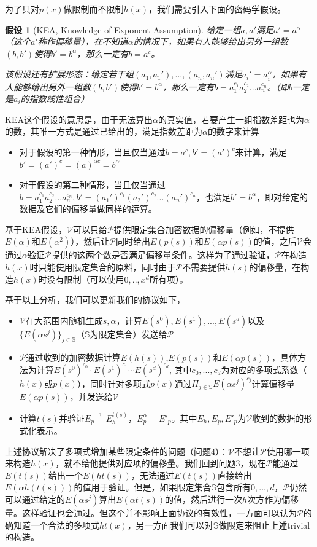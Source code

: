 \documentclass[12pt]{article}
\newcommand{\pp}{$\mathcal{P}$}
\newcommand{\vv}{$\mathcal{V}$}
\newtheorem{assumption}{假设}
\begin{document}
为了只对$p(x)$做限制而不限制$h(x)$，我们需要引入下面的密码学假设。
\begin{assumption}[KEA, Knowledge-of-Exponent Assumption]
	给定一组$a,a'$满足$a'= a^\alpha$（这个$a'$称作偏移量），在不知道$\alpha$的情况下，如果有人能够给出另外一组数$(b,b')$使得$b'= b^\alpha$，那么一定有$b=a^c$。

	该假设还有扩展形态：给定若干组$(a_1,a_1'),...,(a_n,a_n')$满足$a_i'=a_i^\alpha$，如果有人能够给出另外一组数$(b,b')$使得$b'= b^\alpha$，那么一定有$b=a_1^{c_1}a_2^{c_2}...a_n^{c_n}$。（即$b$一定是$a_i$的指数线性组合）
\end{assumption}
KEA这个假设的意思是，由于无法算出$\alpha$的真实值，若要产生一组指数差距也为$\alpha$的数，其唯一方式是通过已给出的，满足指数差距为$\alpha$的数字来计算
\begin{itemize}
	\item 对于假设的第一种情形，当且仅当通过$b=a^c,b'=(a')^c$来计算，满足$b'= (a')^c=(a)^{\alpha c} = b^\alpha$
	\item 对于假设的第二种情形，当且仅当通过$b=a_1^{c_1}a_2^{c_2}...a_n^{c_n},b'=(a_1')^{c_1}(a_2')^{c_2}...(a_n')^{c_n}$，也满足$b'=b^\alpha$，即对给定的数据及它们的偏移量做同样的运算。
\end{itemize}
基于KEA假设，\vv 可以只给\pp 提供限定集合加密数据的偏移量（例如，不提供$E(\alpha)$和$E(\alpha ^2)$），然后让\pp 同时给出$E(p(s))$和$E(\alpha p(s))$的值，之后\vv 会通过$\alpha$验证\pp 提供的这两个数是否满足偏移量条件。这样为了通过验证，\pp 在构造$h(x)$时只能使用限定集合的原料，同时由于\pp 不需要提供$h(s)$的偏移量，在构造$h(x)$时没有限制（可以使用$0,..,x^d$所有项）。

基于以上分析，我们可以更新我们的协议如下，
\begin{itemize}
	\item \vv 在大范围内随机生成$s,\alpha$，计算$E(s^0),E(s^1),...,E(s^d)$以及$\{E(\alpha s^j)\}_{j\in \mathbb{S}}$（$\mathbb{S}$为限定集合）发送给\pp
	\item \pp 通过收到的加密数据计算$E(h(s))$,$E(p(s))$和$E(\alpha p(s))$，具体方法为计算$E(s^0)^{c_0}\cdot E(s^1)^{c_1}\cdots E(s^d)^{c_d}$, 其中$c_0,...,c_d$为对应的多项式系数（$h(x)$或$p(x)$），同时针对多项式$p(x)$通过$\Pi_{j \in \mathbb{S}} E(\alpha s^j)^{c_j}$计算偏移量$E(\alpha p(s))$，并发送给\vv
	\item 计算$t(s)$并验证$E_p \overset{?}{=}E_h^{t(s)}$，$E_p^\alpha = E'_p$。其中$E_h,E_p,E'_p$为\vv 收到的数据的形式化表示。
\end{itemize}
上述协议解决了多项式增加某些限定条件的问题（问题4）：\vv 不想让\pp 使用哪一项来构造$h(x)$，就不给他提供对应项的偏移量。我们回到问题3，现在\pp 能通过$E(t(s))$给出一个$E(ht(s))$，无法通过$E(t(s))$直接给出$E(\alpha h(t(s)))$的值用于验证。但是，如果限定集合$\mathbb{S}$包含所有$0,...,d$，\pp 仍然可以通过给定的$E(\alpha s^j)$算出$E(\alpha t(s))$的值，然后进行一次$h$次方作为偏移量。这样验证也会通过。但这个并不影响上面协议的有效性，一方面可以认为\pp 的确知道一个合法的多项式$ht(x)$，另一方面我们可以对$\mathbb{S}$做限定来阻止上述trivial的构造。
\end{document}
